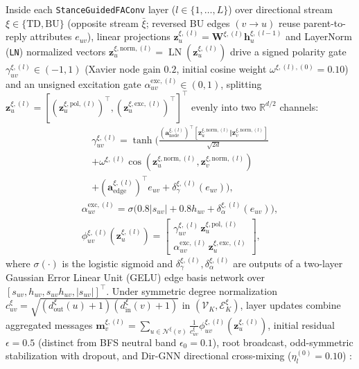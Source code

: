 \documentclass[conference]{IEEEtran}
\begin{document}
Inside each \texttt{StanceGuidedFAConv} layer ($l \in \{1, \dots, L\}$) over directional stream $\xi \in \{\text{TD}, \text{BU}\}$ (opposite stream $\bar{\xi}$; reversed BU edges $(v \to u)$ reuse parent-to-reply attributes $e_{uv}$), linear projections $\mathbf{z}_u^{\xi,(l)} = \mathbf{W}^{\xi,(l)} \mathbf{h}_u^{\xi,(l-1)}$ and LayerNorm (\texttt{LN}) normalized vectors $\mathbf{z}_u^{\xi,\text{norm},(l)} = \operatorname{LN}(\mathbf{z}_u^{\xi,(l)})$ drive a signed polarity gate $\gamma_{uv}^{\xi,(l)} \in (-1, 1)$ (Xavier node gain $0.2$, initial cosine weight $\omega^{\xi,(l),(0)} = 0.10$) and an unsigned excitation gate $\alpha_{uv}^{\text{exc},(l)} \in (0, 1)$, splitting $\mathbf{z}_u^{\xi,(l)} = [(\mathbf{z}_u^{\xi,\text{pol},(l)})^\top, (\mathbf{z}_u^{\xi,\text{exc},(l)})^\top]^\top$ evenly into two $\mathbb{R}^{d/2}$ channels:
\begin{multline}
\gamma_{uv}^{\xi,(l)} = \tanh\!\Biggl(\frac{(\mathbf{a}_{\text{node}}^{\xi,(l)})^\top [\mathbf{z}_u^{\xi,\text{norm},(l)} \Vert \mathbf{z}_v^{\xi,\text{norm},(l)}]}{\sqrt{2d}} \\
+ \omega^{\xi,(l)} \cos(\mathbf{z}_u^{\xi,\text{norm},(l)}, \mathbf{z}_v^{\xi,\text{norm},(l)}) \\
+ (\mathbf{a}_{\text{edge}}^{\xi,(l)})^\top e_{uv} + \delta_{\gamma}^{\xi,(l)}(e_{uv})\Biggr),
\end{multline}
\begin{multline}
\alpha_{uv}^{\text{exc},(l)} = \sigma\bigl(0.8|s_{uv}| + 0.8 h_{uv} + \delta_{\alpha}^{\xi,(l)}(e_{uv})\bigr), \\
\phi_{uv}^{\xi,(l)}(\mathbf{z}_u^{\xi,(l)}) = \begin{bmatrix} \gamma_{uv}^{\xi,(l)}\, \mathbf{z}_u^{\xi,\text{pol},(l)} \\ \alpha_{uv}^{\text{exc},(l)}\, \mathbf{z}_u^{\xi,\text{exc},(l)} \end{bmatrix},
\end{multline}
where $\sigma(\cdot)$ is the logistic sigmoid and $\delta_{\gamma}^{\xi,(l)}, \delta_{\alpha}^{\xi,(l)}$ are outputs of a two-layer Gaussian Error Linear Unit (GELU) edge basis network over $[s_{uv}, h_{uv}, s_{uv} h_{uv}, |s_{uv}|]^\top$. Under symmetric degree normalization $c_{uv}^{\xi} = \sqrt{(d_{\text{out}}^{\xi}(u)+1)(d_{\text{in}}^{\xi}(v)+1)}$ in $(\mathcal{V}_K, \mathcal{E}_K^\xi)$, layer updates combine aggregated messages $\mathbf{m}_v^{\xi,(l)} = \sum_{u \in \mathcal{N}^{\xi}(v)} \frac{1}{c_{uv}^{\xi}}\phi_{uv}^{\xi,(l)}(\mathbf{z}_u^{\xi,(l)})$, initial residual $\epsilon = 0.5$ (distinct from BFS neutral band $\epsilon_0 = 0.1$), root broadcast, odd-symmetric stabilization with dropout, and Dir-GNN directional cross-mixing ($\eta_l^{(0)} = 0.10$) \cite{rossi2023edge}:
\end{document}

